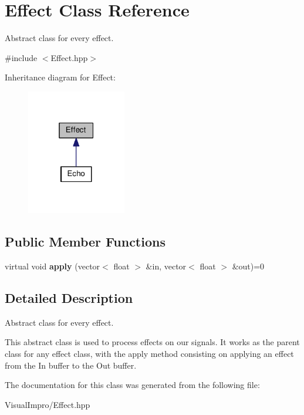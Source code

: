 \hypertarget{class_effect}{}\section{Effect Class Reference}
\label{class_effect}


Abstract class for every effect.  




{\ttfamily \#include $<$Effect.\+hpp$>$}



Inheritance diagram for Effect\+:
\nopagebreak
\begin{figure}[H]
\begin{center}
\leavevmode
\includegraphics[width=123pt]{class_effect__inherit__graph}
\end{center}
\end{figure}
\subsection*{Public Member Functions}
\begin{DoxyCompactItemize}
\item 
\mbox{\label{class_effect_af8aa91c55bf4d6651e5aec73e0741379}} 
virtual void {\bfseries apply} (vector$<$ float $>$ \&in, vector$<$ float $>$ \&out)=0
\end{DoxyCompactItemize}


\subsection{Detailed Description}
Abstract class for every effect. 

This abstract class is used to process effects on our signals. It works as the parent class for any effect class, with the apply method consisting on applying an effect from the In buffer to the Out buffer. 

The documentation for this class was generated from the following file\+:\begin{DoxyCompactItemize}
\item 
Visual\+Impro/Effect.\+hpp\end{DoxyCompactItemize}
